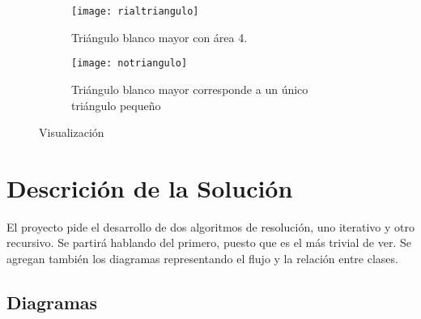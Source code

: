 \documentclass[letterpaper]{article}
\begin{document}
    \begin{figure}
      \centering
      \begin{subfigure}{0.45\textwidth}
        \texttt{[image: rialtriangulo]}
        \caption{Tri\'angulo blanco mayor con \'area 4.}
        \label{subfig:rialtriangulo}
      \end{subfigure}
      \begin{subfigure}{0.45\textwidth}
        \texttt{[image: notriangulo]}
        \caption{Tri\'angulo blanco mayor corresponde a un \'unico tri\'angulo peque\~no}
        \label{subfig:notriangulo}
      \end{subfigure}
      \caption{Visualizaci\'on}
    \end{figure}

  \newpage
  \section{Descrici\'on de la Soluci\'on}
  El proyecto pide el desarrollo de dos algoritmos de resoluci\'on, uno iterativo
  y otro recursivo. Se partir\'a hablando del primero, puesto que es el m\'as trivial
  de ver. Se agregan tambi\'en los diagramas representando el flujo y la relaci\'on
  entre clases.

  \subsection{Diagramas}
\end{document}
